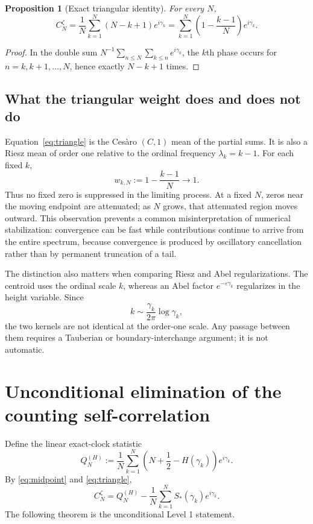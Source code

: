 \documentclass[11pt]{amsart}
\numberwithin{equation}{section}
\newtheorem{proposition}[theorem]{Proposition}
\theoremstyle{definition}
\theoremstyle{remark}
\begin{document}
\begin{proposition}[Exact triangular identity]\label{prop:triangle}
For every $N$,
\begin{equation}\label{eq:triangle}
\boxed{
C_N^{\zeta}
=\frac1N\sum_{k=1}^N(N-k+1)e^{i\gamma_k}
=\sum_{k=1}^N\left(1-\frac{k-1}{N}\right)e^{i\gamma_k}.
}
\end{equation}
\end{proposition}
\begin{proof}
In the double sum $N^{-1}\sum_{n\le N}\sum_{k\le n}e^{i\gamma_k}$, the $k$th phase occurs for $n=k,k+1,\ldots,N$, hence exactly $N-k+1$ times.
\end{proof}

\subsection{What the triangular weight does and does not do}
Equation~\eqref{eq:triangle} is the Cesàro $(C,1)$ mean of the partial sums.  It is also a Riesz mean of order one relative to the ordinal frequency $\lambda_k=k-1$.  For each fixed $k$,
\[
w_{k,N}:=1-\frac{k-1}{N}\longrightarrow1.
\]
Thus no fixed zero is suppressed in the limiting process.  At a fixed $N$, zeros near the moving endpoint are attenuated; as $N$ grows, that attenuated region moves outward.  This observation prevents a common misinterpretation of numerical stabilization: convergence can be fast while contributions continue to arrive from the entire spectrum, because convergence is produced by oscillatory cancellation rather than by permanent truncation of a tail.

The distinction also matters when comparing Riesz and Abel regularizations.  The centroid uses the ordinal scale $k$, whereas an Abel factor $e^{-\varepsilon\gamma_k}$ regularizes in the height variable.  Since
\[
k\sim \frac{\gamma_k}{2\pi}\log\gamma_k,
\]
the two kernels are not identical at the order-one scale.  Any passage between them requires a Tauberian or boundary-interchange argument; it is not automatic.

\section{Unconditional elimination of the counting self-correlation}\label{sec:level1}

Define the linear exact-clock statistic
\begin{equation}\label{eq:QH}
Q_N^{(H)}
:=\frac1N\sum_{k=1}^N
\left(N+\frac12-H(\gamma_k)\right)e^{i\gamma_k}.
\end{equation}
By \eqref{eq:midpoint} and \eqref{eq:triangle},
\begin{equation}\label{eq:exactCQ}
\boxed{
C_N^{\zeta}=Q_N^{(H)}-\frac1N\sum_{k=1}^N S_*(\gamma_k)e^{i\gamma_k}.
}
\end{equation}
The following theorem is the unconditional Level 1 statement.
\end{document}
